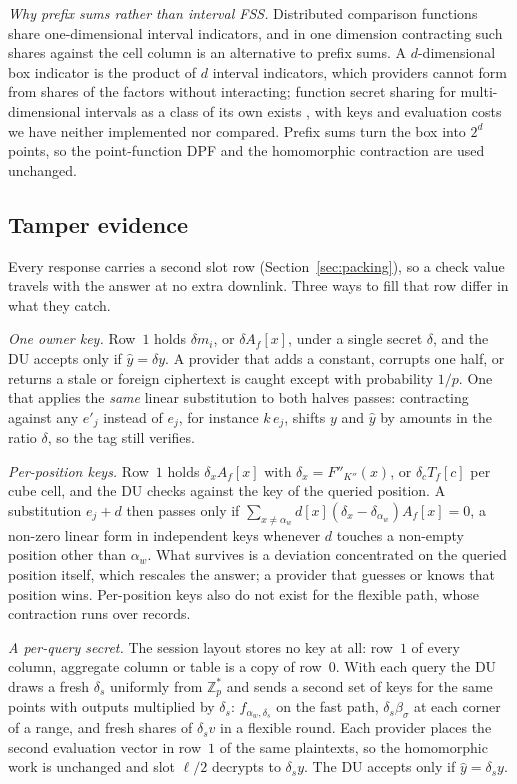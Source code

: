 \documentclass[a4paper,fleqn]{cas-sc}
\begin{document}
\emph{Why prefix sums rather than interval FSS.} Distributed comparison
functions \citep{boyle2016function} share one-dimensional interval indicators,
and in one dimension contracting such shares against the cell column is an
alternative to prefix sums. A $d$-dimensional box indicator is the product of
$d$ interval indicators, which providers cannot form from shares of the
factors without interacting; function secret sharing for multi-dimensional
intervals as a class of its own exists \citep{boyle2016function}, with keys and
evaluation costs we have neither implemented nor compared. Prefix sums turn the box into $2^d$ points, so the
point-function DPF and the homomorphic contraction are used unchanged.


\subsection{Tamper evidence}
\label{sec:verify}
Every response carries a second slot row (Section~\ref{sec:packing}), so a
check value travels with the answer at no extra downlink. Three ways to fill
that row differ in what they catch.

\emph{One owner key.} Row~$1$ holds $\delta m_i$, or $\delta A_f[x]$, under a
single secret $\delta$, and the DU accepts only if $\hat y=\delta y$. A provider
that adds a constant, corrupts one half, or returns a stale or foreign
ciphertext is caught except with probability $1/p$. One that applies the
\emph{same} linear substitution to both halves passes: contracting against any
$e'_j$ instead of $e_j$, for instance $k\,e_j$, shifts $y$ and $\hat y$ by
amounts in the ratio $\delta$, so the tag still verifies.

\emph{Per-position keys.} Row~$1$ holds $\delta_xA_f[x]$ with
$\delta_x=F''_{K''}(x)$, or $\delta_cT_f[c]$ per cube cell, and the DU checks
against the key of the queried position. A substitution $e_j+d$ then passes
only if $\sum_{x\neq\alpha_w}d[x](\delta_x-\delta_{\alpha_w})A_f[x]=0$, a
non-zero linear form in independent keys whenever $d$ touches a non-empty
position other than $\alpha_w$. What survives is a deviation concentrated on
the queried position itself, which rescales the answer; a provider that guesses
or knows that position wins. Per-position keys also do not exist for the
flexible path, whose contraction runs over records.

\emph{A per-query secret.} The session layout stores no key at all: row~$1$ of
every column, aggregate column or table is a copy of row~$0$. With each query
the DU draws a fresh $\delta_s$ uniformly from $\mathbb{Z}_p^{*}$ and sends a
second set of keys for the same points with outputs multiplied by $\delta_s$:
$f_{\alpha_w,\delta_s}$ on the fast path, $\delta_s\beta_\sigma$ at each corner
of a range, and fresh shares of $\delta_s v$ in a flexible round. Each provider
places the second evaluation vector in row~$1$ of the same plaintexts, so the
homomorphic work is unchanged and slot $\ell/2$ decrypts to $\delta_s y$. The
DU accepts only if $\hat y=\delta_s y$.
\end{document}
